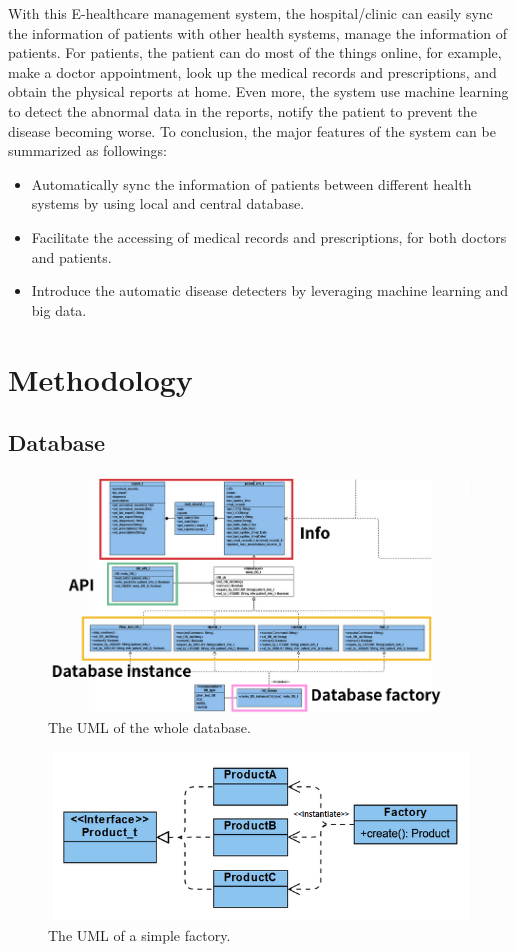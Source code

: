 \documentclass{article}
\begin{document}
With this E-healthcare management system, the hospital/clinic can easily 
sync the information of patients with other health systems, manage 
the information of patients.
For patients, the patient can do most of the things online, for example, 
make a doctor appointment, look up the medical records and prescriptions, 
and obtain the physical reports at home. Even more, the system use machine 
learning to detect the abnormal data in the reports, notify the patient 
to prevent the disease becoming worse. 
To conclusion, the major features of the system can be summarized as 
followings: 
\begin{itemize}
  \item Automatically sync the information of patients between different health systems by using local and central database. 
  \item Facilitate the accessing of medical records and prescriptions, for both doctors and patients. 
  \item Introduce the automatic disease detecters by leveraging machine learning and big data. 
\end{itemize}

\section{Methodology}
\label{sec:methodology}
\subsection*{Database}
\begin{figure}[h]
  \centering
  \includegraphics[scale = 0.7]{asset/DB_UML.png}
  \caption{The UML of the whole database.}
  \label{fig:DB_UML}
\end{figure}
\begin{figure}[h]
  \centering
  \includegraphics[scale = 0.7]{asset/simple_factory.png}
  \caption{The UML of a simple factory.}
  \label{fig:simple_factory}
\end{figure}
\end{document}
